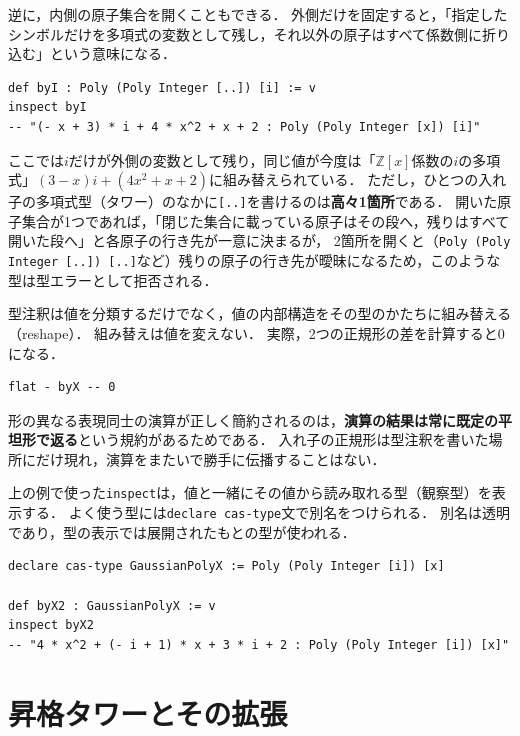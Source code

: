 逆に，内側の原子集合を開くこともできる．
外側だけを固定すると，「指定したシンボルだけを多項式の変数として残し，それ以外の原子はすべて係数側に折り込む」という意味になる．
\begin{lstlisting}[language=egison,numbers=none]
def byI : Poly (Poly Integer [..]) [i] := v
inspect byI
-- "(- x + 3) * i + 4 * x^2 + x + 2 : Poly (Poly Integer [x]) [i]"
\end{lstlisting}
ここでは$i$だけが外側の変数として残り，同じ値が今度は「$\mathbb{Z}[x]$係数の$i$の多項式」$(3 - x)i + (4x^2 + x + 2)$に組み替えられている．
ただし，ひとつの入れ子の多項式型（タワー）のなかに\lstinline{[..]}を書けるのは\textbf{高々1箇所}である．
開いた原子集合が1つであれば，「閉じた集合に載っている原子はその段へ，残りはすべて開いた段へ」と各原子の行き先が一意に決まるが，
2箇所を開くと（\lstinline{Poly (Poly Integer [..]) [..]}など）残りの原子の行き先が曖昧になるため，このような型は型エラーとして拒否される．

型注釈は値を分類するだけでなく，値の内部構造をその型のかたちに組み替える（reshape）．
組み替えは値を変えない．
実際，2つの正規形の差を計算すると$0$になる．
\begin{lstlisting}[language=egison,numbers=none]
flat - byX -- 0
\end{lstlisting}
形の異なる表現同士の演算が正しく簡約されるのは，\textbf{演算の結果は常に既定の平坦形で返る}という規約があるためである．
入れ子の正規形は型注釈を書いた場所にだけ現れ，演算をまたいで勝手に伝播することはない．

上の例で使った\lstinline{inspect}は，値と一緒にその値から読み取れる型（観察型）を表示する．
よく使う型には\lstinline{declare cas-type}文で別名をつけられる．
別名は透明であり，型の表示では展開されたもとの型が使われる．
\begin{lstlisting}[language=egison,numbers=none]
declare cas-type GaussianPolyX := Poly (Poly Integer [i]) [x]

def byX2 : GaussianPolyX := v
inspect byX2
-- "4 * x^2 + (- i + 1) * x + 3 * i + 2 : Poly (Poly Integer [i]) [x]"
\end{lstlisting}

\section{昇格タワーとその拡張}\label{cas-subtype}

